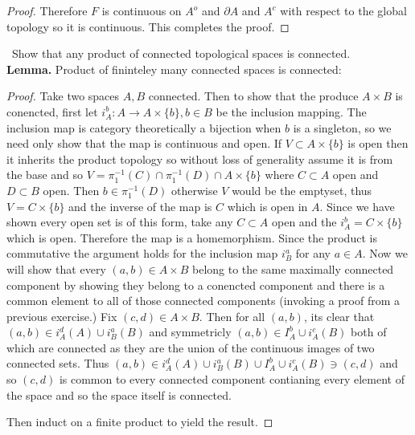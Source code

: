 \documentclass[11pt]{amsart}
\theoremstyle{definition}
\numberwithin{theorem}{section}
\numberwithin{definition}{section}
\numberwithin{equation}{section}
\begin{document}
\begin{proof}
	 Therefore $F$ is continuous on $A^o$ and $\partial A$ and $A^c$ with respect to the global topology so it is continuous. This completes the proof.
	\end{proof}
\medskip {}\ Show that any product of connected topological spaces is connected.\\
\textbf{Lemma.} Product of fininteley many connected spaces is connected:
\begin{proof}
	Take two spaces $A, B$ connected. Then to show that the produce $A \times B$ is conencted, first let $i_A^b: A \to A \times \{b\}, b\in B$ be the inclusion mapping. The inclusion map is category theoretically a bijection when $b$ is a singleton, so we need only show that the map is continuous and open. If $V \subset A \times \{b\}$ is open then it inherits the product topology so without loss of generality assume it is from the base and so $V = \pi_1^{-1}(C) \cap \pi^{-1}_1(D) \cap A \times \{b\}$
where $C \subset A$ open and $D \subset B$ open. Then $b \in \pi^{-1}_1(D)$ otherwise $V$ would be the emptyset, thus $V = C \times \{b\}$ and the inverse of the map is $C$ which is open in $A$. Since we have shown every open set is of this form, take any $C \subset A$ open and the $i_{A}^b = C \times \{b\}$ which is open. Therefore the map is a homemorphism. Since the product is commutative the argument holds for the inclusion map $i_B^a$ for any $a \in A$. Now we will show that every $(a,b) \in A \times B$ belong to the same maximally connected component by showing they belong to a conencted component and there is a common element to all of those connected components (invoking a proof from a previous exercise.) Fix $(c,d) \in A \times B$. Then for all $(a,b)$, its clear that $(a,b) \in i_A^d(A) \cup i_B^a(B)$ and symmetricly $(a,b) \in I_A^b \cup i_A^c(B)$
both of which are connected as they are the union of the continuous images of two connected sets. Thus
 $(a,b) \in i_A^d(A) \cup i_B^a(B) \cup I_A^b \cup i_A^c(B) \ni (c,d)$ and so $(c,d)$ is common to every connected component contianing every element of the space and so the space itself is connected.

 Then induct on a finite product to yield the result.
\end{proof}
\end{document}

